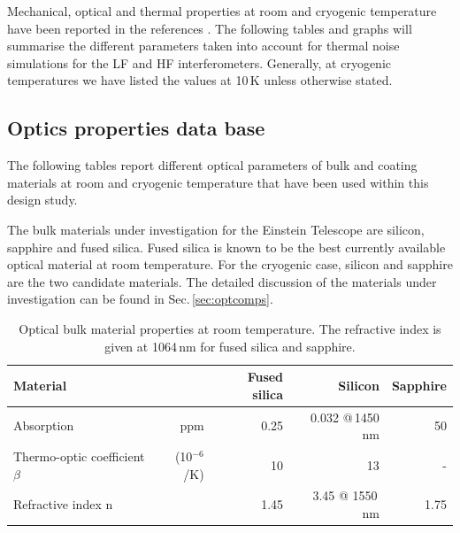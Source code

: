 
Mechanical, optical and thermal properties at room and cryogenic temperature have been reported in the references \cite{Franc2009,Nawrodt2009_ET}. The following tables and graphs will summarise the different parameters taken into account for thermal noise simulations for the LF and HF interferometers. Generally, at cryogenic temperatures we have listed the values at 10\,K unless otherwise stated.

\FloatBarrier
\subsection{Optics properties data base}\label{app:opticsdb}

The following tables report different optical parameters of bulk and coating materials at room and cryogenic temperature that have been used within this design study.

The bulk materials under investigation for the Einstein Telescope are silicon, sapphire and fused silica. Fused silica is known to be the best currently available optical material at room temperature. For the cryogenic case, silicon and sapphire are the two candidate materials. The detailed discussion of the materials under investigation can be found in Sec.\,\ref{sec:optcomps}.
\begin{table}[h!]
\begin{center}
\begin{tabular}{|l r||r|r|r|}
  \hline
  {\large\strut} Material  & & Fused silica & Silicon & Sapphire \\
  \hline
  \hline
  {\large\strut} Absorption & ppm & 0.25 \cite{BSAbsorbHild2006} & 0.032 @\,1450 nm \cite{Green1995} & 50  \cite{Yan2006} \\
  {\large\strut} Thermo-optic coefficient $\beta$ & (10$^{-6}$/K) & 10 & 13 & - \\
  {\large\strut} Refractive index n & & 1.45 & 3.45 @ 1550\,nm & 1.75\\
 \hline
\end{tabular}
\caption{Optical bulk material properties at room temperature. The refractive index is given at 1064\,nm for fused silica and sapphire.}
\end{center}
\label{tab:Optics_Bulk_Param}
\end{table}

